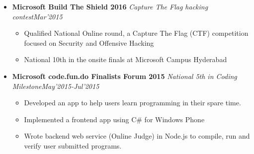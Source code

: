 \documentclass[11pt,a4paper]{moderncv}
\newcommand{\experience}[4]{
  \vspace{0.1cm}
\item \textbf{\large{#1}} \textit{#2}\hfill\textit{#3}
  \begin{itemize}[leftmargin=*]
    \setlength\itemsep{0em} #4
  \end{itemize}
}
\begin{document}
\begin{itemize}
  \experience{Microsoft Build The Shield 2016}{Capture The Flag
    hacking contest}{Mar'2015}{
  \item Qualified National Online round, a Capture The Flag (CTF)
    competition focused on Security and Offensive Hacking
  \item National 10th in the onsite finals at Microsoft Campus Hyderabad
  }

  \experience{Microsoft code.fun.do Finalists Forum 2015}{National 5th in Coding Milestone}{May'2015-Jul'2015}{
  \item Developed an app to help users learn programming in their spare time.
  \item Implemented a frontend app using C\# for Windows Phone
  \item Wrote backend web service (Online Judge) in Node.js to compile, run and verify user submitted programs.
  }
\end{itemize}
\end{document}
